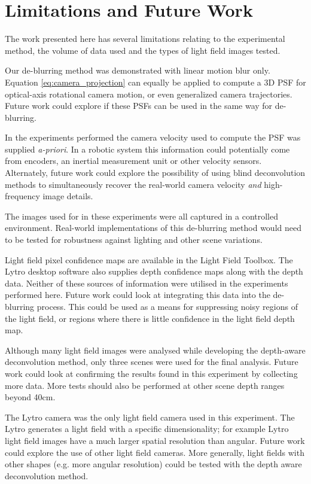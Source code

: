 \section{Limitations and Future Work}
\label{sec:limitations_and_future_work}

The work presented here has several limitations relating to the experimental method, the volume of data used and the types of light field images tested.

Our de-blurring method was demonstrated with linear motion blur only.
Equation \ref{eq:camera_projection} can equally be applied to compute a 3D PSF for optical-axis rotational camera motion, or even generalized camera trajectories.
Future work could explore if these PSFs can be used in the same way for de-blurring.

In the experiments performed the camera velocity used to compute the PSF was supplied \emph{a-priori}.
In a robotic system this information could potentially come from encoders, an inertial measurement unit or other velocity sensors.
Alternately, future work could explore the possibility of using blind deconvolution methods to simultaneously recover the real-world camera velocity \emph{and} high-frequency image details.

The images used for in these experiments were all captured in a controlled environment.
Real-world implementations of this de-blurring method would need to be tested for robustness against lighting and other scene variations.

Light field pixel confidence maps are available in the Light Field Toolbox.
The Lytro desktop software also supplies depth confidence maps along with the depth data.
Neither of these sources of information were utilised in the experiments performed here.
Future work could look at integrating this data into the de-blurring process.
This could be used as a means for suppressing noisy regions of the light field, or regions where there is little confidence in the light field depth map.

Although many light field images were analysed while developing the depth-aware deconvolution method, only three scenes were used for the final analysis.
Future work could look at confirming the results found in this experiment by collecting more data.
More tests should also be performed at other scene depth ranges beyond 40cm.

The Lytro camera was the only light field camera used in this experiment.
The Lytro generates a light field with a specific dimensionality; for example Lytro light field images have a much larger spatial resolution than angular.
Future work could explore the use of other light field cameras.
More generally, light fields with other shapes (e.g. more angular resolution) could be tested with the depth aware deconvolution method.

